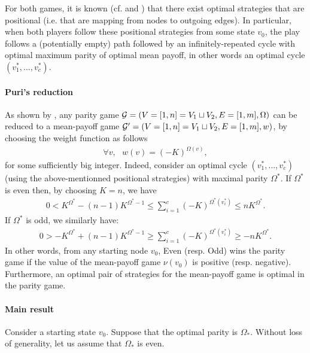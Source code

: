 \documentclass{article}
\def\G{{\cal G}}
\begin{document}
For both games, it is known (cf. \citet{zielonka98} and \citet{ehrenfeucht79}) that there exist optimal strategies that are positional (i.e. that are mapping from nodes to outgoing edges). In particular, when both players follow these positional strategies from some state $v_0$, the play follows a (potentially empty) path followed by an infinitely-repeated cycle with optimal maximum parity of optimal mean payoff, in other words an optimal cycle $(v^*_1,\dots,v^*_c)$.

\paragraph{Puri's reduction}

As shown by \citet{puri96}, any parity game $\G=(V=[1,n]=V_1 \sqcup V_2,E=[1,m],\Omega)$ can be reduced to a mean-payoff game $\G'=(V=[1,n]=V_1 \sqcup V_2,E=[1,m],w)$, by choosing the weight function as follows
\begin{align}
  \forall v,~~~ w(v) = (-K)^{\Omega(v)},
\end{align}
for some sufficiently big integer.
Indeed, consider an optimal cycle $(v^*_1,\dots,v^*_c)$ (using the above-mentionned positional strategies) with maximal parity $\Omega^*$. If $\Omega^*$ is even then, by choosing $K=n$, we have
\begin{align}
 0 <  K^{\Omega^*} - (n-1) K^{\Omega^*-1} \le  \sum_{i=1}^{c} (-K)^{\Omega^*(v^*_i)} \le n K^{\Omega^*}.
\end{align}
If $\Omega^*$ is odd, we similarly have:
\begin{align}
0 > -K^{\Omega^*} + (n-1) K^{\Omega^*-1} \ge   \sum_{i=1}^{c} (-K)^{\Omega^*(v^*_i)} \ge -n K^{\Omega^*}.
\end{align}
In other words, from any starting node $v_0$, Even (resp. Odd) wins the parity game if the value of the mean-payoff game $\nu(v_0)$ is positive (resp. negative). Furthermore, an optimal pair of strategies for the mean-payoff game is optimal in the parity game.

\paragraph{Main result}

Consider a starting state $v_0$. Suppose that the optimal parity is $\Omega_*$. Without loss of generality, let us assume that $\Omega_*$ is even.
\end{document}

